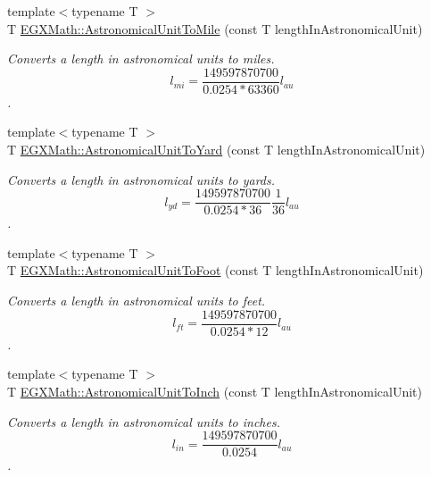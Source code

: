 \begin{DoxyCompactItemize}
{\footnotesize template$<$typename T $>$ }\\T \mbox{\hyperlink{group___e_g_x_math-_conversions-_length_conversions-_astronomical-_astronomical_unit-_imperial_ga24da571320e08bb0a057e77e15e786b1}{E\+G\+X\+Math\+::\+Astronomical\+Unit\+To\+Mile}} (const T length\+In\+Astronomical\+Unit)
\begin{DoxyCompactList}\small\item\em Converts a length in astronomical units to miles. \[ l_{mi}=\frac{149597870700}{0.0254 * 63360} l_{au} \]. \end{DoxyCompactList}\item 
{\footnotesize template$<$typename T $>$ }\\T \mbox{\hyperlink{group___e_g_x_math-_conversions-_length_conversions-_astronomical-_astronomical_unit-_imperial_ga7d383bdfc1850ed19f5b6df13704c7af}{E\+G\+X\+Math\+::\+Astronomical\+Unit\+To\+Yard}} (const T length\+In\+Astronomical\+Unit)
\begin{DoxyCompactList}\small\item\em Converts a length in astronomical units to yards. \[ l_{yd}= \frac{149597870700}{0.0254 * 36} \frac{1}{36} l_{au} \]. \end{DoxyCompactList}\item 
{\footnotesize template$<$typename T $>$ }\\T \mbox{\hyperlink{group___e_g_x_math-_conversions-_length_conversions-_astronomical-_astronomical_unit-_imperial_ga09db4693d70e24b3a933582badf882af}{E\+G\+X\+Math\+::\+Astronomical\+Unit\+To\+Foot}} (const T length\+In\+Astronomical\+Unit)
\begin{DoxyCompactList}\small\item\em Converts a length in astronomical units to feet. \[ l_{ft}= \frac{149597870700}{0.0254 * 12} l_{au} \]. \end{DoxyCompactList}\item 
{\footnotesize template$<$typename T $>$ }\\T \mbox{\hyperlink{group___e_g_x_math-_conversions-_length_conversions-_astronomical-_astronomical_unit-_imperial_ga75ba3ea9f789b7d12627bc67e4a4e904}{E\+G\+X\+Math\+::\+Astronomical\+Unit\+To\+Inch}} (const T length\+In\+Astronomical\+Unit)
\begin{DoxyCompactList}\small\item\em Converts a length in astronomical units to inches. \[ l_{in}= \frac{149597870700}{0.0254} l_{au} \]. \end{DoxyCompactList}\item 

\end{DoxyCompactItemize}
